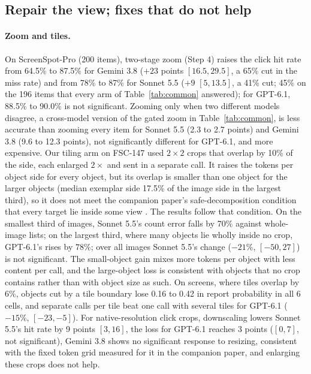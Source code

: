\subsection{Repair the view; fixes that do not help}\label{sec:res:view}

\paragraph{Zoom and tiles.} On ScreenSpot-Pro (200 items), two-stage zoom (Step 4) raises the click hit rate from 64.5\% to 87.5\% for Gemini 3.8 ($+23$ points $[16.5,29.5]$, a 65\% cut in the miss rate) and from 78\% to 87\% for Sonnet 5.5 ($+9$ $[5,13.5]$, a 41\% cut; 45\% on the 196 items that every arm of Table~\ref{tab:common} answered); for GPT-6.1, 88.5\% to 90.0\% is not significant. Zooming only when two different models disagree, a cross-model version of the gated zoom in Table~\ref{tab:common}, is less accurate than zooming every item for Sonnet 5.5 (2.3 to 2.7 points) and Gemini 3.8 (9.6 to 12.3 points), not significantly different for GPT-6.1, and more expensive. Our tiling arm on FSC-147 used $2\times2$ crops that overlap by 10\% of the side, each enlarged $2\times$ and sent in a separate call. It raises the tokens per object side for every object, but its overlap is smaller than one object for the larger objects (median exemplar side 17.5\% of the image side in the largest third), so it does not meet the companion paper's safe-decomposition condition that every target lie inside some view \citep{shi2026zoomin}. The results follow that condition. On the smallest third of images, Sonnet 5.5's count error falls by 70\% against whole-image lists; on the largest third, where many objects lie wholly inside no crop, GPT-6.1's rises by 78\%; over all images Sonnet 5.5's change ($-21\%$, $[-50,27]$) is not significant. The small-object gain mixes more tokens per object with less content per call, and the large-object loss is consistent with objects that no crop contains rather than with object size as such. On screens, where tiles overlap by 6\%, objects cut by a tile boundary lose 0.16 to 0.42 in report probability in all 6 cells, and separate calls per tile beat one call with several tiles for GPT-6.1 ($-15\%$, $[-23,-5]$). For native-resolution click crops, downscaling lowers Sonnet 5.5's hit rate by 9 points $[3,16]$, the loss for GPT-6.1 reaches 3 points ($[0,7]$, not significant), Gemini 3.8 shows no significant response to resizing, consistent with the fixed token grid measured for it in the companion paper, and enlarging these crops does not help.

